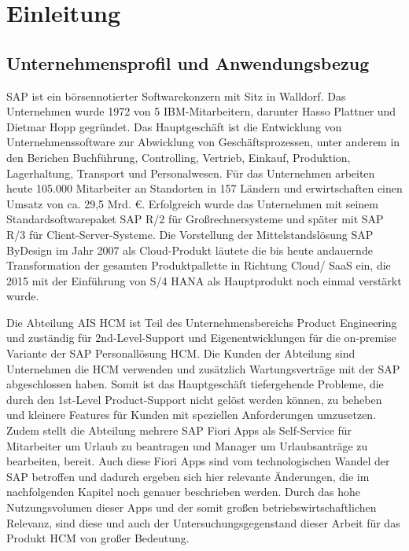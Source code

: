 \chapter{Einleitung}

\section{Unternehmensprofil und Anwendungsbezug}

SAP ist ein börsennotierter Softwarekonzern mit Sitz in Walldorf. Das Unternehmen wurde 1972 von 5 IBM-Mitarbeitern, darunter Hasso Plattner und Dietmar Hopp gegründet. Das Hauptgeschäft ist die Entwicklung von Unternehmenssoftware zur Abwicklung von Geschäftsprozessen, unter anderem in den Berichen Buchführung, Controlling, Vertrieb, Einkauf, Produktion, Lagerhaltung, Transport und Personalwesen. Für das Unternehmen arbeiten heute 105.000 Mitarbeiter an Standorten in 157 Ländern und erwirtschaften einen Umsatz von ca. 29,5 Mrd. \euro{}. Erfolgreich wurde das Unternehmen mit seinem Standardsoftwarepaket SAP R/2 für Gro{\ss}rechnersysteme und später mit SAP R/3 für Client-Server-Systeme. Die Vorstellung der Mittelstandslösung SAP ByDesign im Jahr 2007 als Cloud-Produkt läutete die bis heute andauernde Transformation der gesamten Produktpallette in Richtung Cloud/ SaaS ein, die 2015 mit der Einführung von S/4 HANA als Hauptprodukt noch einmal verstärkt wurde.

Die Abteilung AIS HCM ist Teil des Unternehmensbereichs Product Engineering und zuständig für 2nd-Level-Support und Eigenentwicklungen für die on-premise Variante der SAP Personallösung HCM. Die Kunden der Abteilung sind Unternehmen die HCM verwenden und zusätzlich Wartungsverträge mit der SAP abgeschlossen haben. Somit ist das Hauptgeschäft tiefergehende Probleme, die durch den 1st-Level Product-Support nicht gelöst werden können, zu beheben und kleinere Features für Kunden mit speziellen Anforderungen umzusetzen. Zudem stellt die Abteilung mehrere SAP Fiori Apps als Self-Service für Mitarbeiter \zB um Urlaub zu beantragen und Manager \zB um Urlaubsanträge zu bearbeiten, bereit. Auch diese Fiori Apps sind vom technologischen Wandel der SAP betroffen und dadurch ergeben sich hier relevante Änderungen, die im nachfolgenden Kapitel noch genauer beschrieben werden. Durch das hohe Nutzungsvolumen dieser Apps und der somit gro{\ss}en betriebswirtschaftlichen Relevanz, sind diese und auch der Untersuchungsgegenstand dieser Arbeit für das Produkt HCM von gro{\ss}er Bedeutung.

